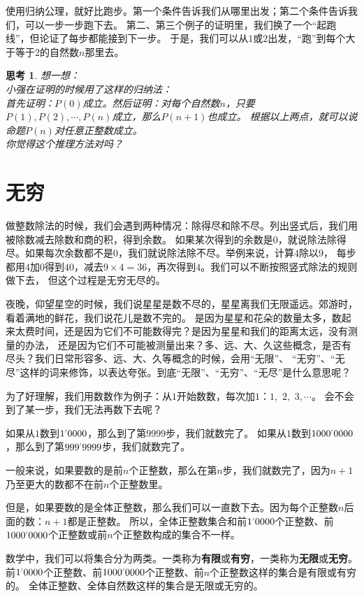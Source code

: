 \documentclass[12pt,UTF8]{ctexbook}
\newtheorem{sk}{思考}[section]
\newcommand{\dlim}[1]{^{\color{gray}\prime}#1}
\begin{document}
使用归纳公理，就好比跑步。第一个条件告诉我们从哪里出发；第二个条件告诉我们，可以一步一步跑下去。
第二、第三个例子的证明里，我们换了一个“起跑线”，但论证了每步都能接到下一步。
于是，我们可以从$1$或$2$出发，“跑”到每个大于等于$2$的自然数$n$那里去。

\begin{sk}\label{sk:2-2-1}
    想一想：\\
    小强在证明的时候用了这样的归纳法：\\
    首先证明：$P(0)$成立。然后证明：对每个自然数$n$，只要$P(1), P(2), \cdots , P(n)$成立，那么$P(n+1)$也成立。
    根据以上两点，就可以说命题$P(n)$对任意正整数成立。\\
    你觉得这个推理方法对吗？
\end{sk}

\section{无穷}
做整数除法的时候，我们会遇到两种情况：除得尽和除不尽。列出竖式后，我们用被除数减去除数和商的积，得到余数。
如果某次得到的余数是$0$，就说除法除得尽。如果每次余数都不是$0$，我们就说除法除不尽。举例来说，计算$4$除以$9$，
每步都用$4$加$0$得到$40$，减去$9\times 4=36$，再次得到$4$。我们可以不断按照竖式除法的规则做下去，
但这个过程是无穷无尽的。

夜晚，仰望星空的时候，我们说星星是数不尽的，星星离我们无限遥远。郊游时，看着满地的鲜花，我们说花儿是数不完的。
是因为星星和花朵的数量太多，数起来太费时间，还是因为它们不可能数得完？是因为星星和我们的距离太远，没有测量的办法，
还是因为它们不可能被测量出来？多、远、大、久这些概念，是否有尽头？我们日常形容多、远、大、久等概念的时候，会用“无限”、
“无穷”、“无尽”这样的词来修饰，以表达夸张。到底“无限”、“无穷”、“无尽”是什么意思呢？

为了好理解，我们用数数作为例子：从$1$开始数数，每次加$1$：$1,\,\,2,\,\,3,\cdots$。
会不会到了某一步，我们无法再数下去呢？

如果从$1$数到$1\dlim{0000}$，那么到了第$9999$步，我们就数完了。
如果从$1$数到$1000\dlim{0000}$，那么到了第$999\dlim{9999}$步，我们就数完了。

一般来说，如果要数的是前$n$个正整数，那么在第$n$步，我们就数完了，因为$n+1$乃至更大的数都不在前$n$个正整数里。

但是，如果要数的是全体正整数，那么我们可以一直数下去。因为每个正整数$n$后面的数：$n+1$都是正整数。
所以，全体正整数集合和前$1\dlim{0000}$个正整数、前$1000\dlim{0000}$个正整数或前$n$个正整数构成的集合不一样。

数学中，我们可以将集合分为两类。一类称为\textbf{有限}或\textbf{有穷}，一类称为\textbf{无限}或\textbf{无穷}。
前$1\dlim{0000}$个正整数、前$1000\dlim{0000}$个正整数、前$n$个正整数这样的集合是有限或有穷的。
全体正整数、全体自然数这样的集合是无限或无穷的。
\end{document}
